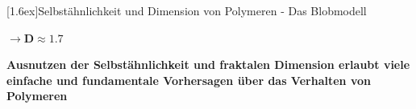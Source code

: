 \documentclass[final]{beamer}
\newlength{\columnheight}
\newlength{\marginw}
\newlength{\tw}
\newlength{\colw}
\newenvironment{myTwoColPoster}{%
  \begin{minipage}[t]{\textwidth}%
    \hspace*{\marginw}%
    \hspace*{9.5bp}%
    \begin{minipage}[t]{\tw}}%
  {\end{minipage}%
   \hspace*{\marginw}%
   \end{minipage}}
\newenvironment{myCol}%
    {\begin{minipage}[t][\columnheight][t]{\colw}}%
    {\end{minipage}}
\newenvironment{textblock}[1]%
    {\begin{block}{\rule[-0.6ex]{0pt}{2.4ex}\raisebox{-0.25ex}[1.6ex]{#1}}%
     \vspace*{5mm}}%
    {\vspace*{5mm}\end{block}}
\begin{document}
\begin{frame}[t]{}
\begin{myTwoColPoster}
\begin{myCol}
\begin{textblock}{Selbst\"ahnlichkeit und Dimension von Polymeren - Das Blobmodell}
\begin{minipage}[c]{0.48\textwidth}
\begin{flushleft}
        \end{flushleft}
      \centerline{ \large ${\boldsymbol{ \rightarrow D\approx1.7}}$}
      \end{minipage}
    \vspace*{4cm}
    \begin{center}
      \textcolor{IPForange}{\textbf{\LARGE Ausnutzen der Selbst\"ahnlichkeit und fraktalen Dimension erlaubt viele einfache und fundamentale Vorhersagen \"uber das Verhalten von Polymeren} }
    \end{center}
   \end{textblock}


\end{myCol}%
\end{myTwoColPoster}
\end{frame}
\end{document}
